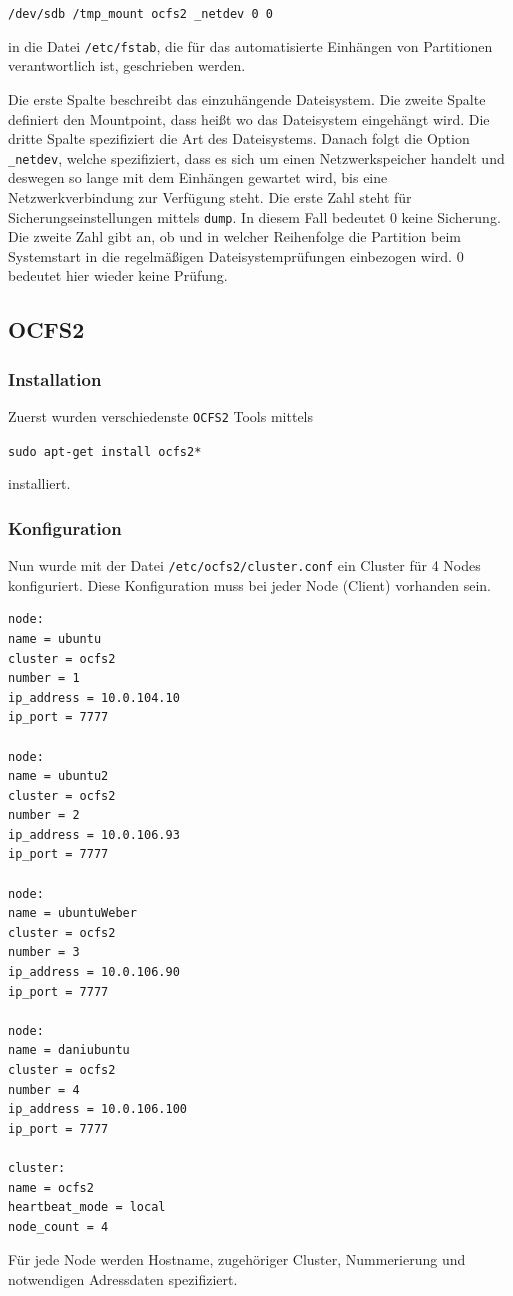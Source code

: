 \texttt{/dev/sdb	/tmp\_mount	ocfs2	\_netdev		0	0}

in die Datei \texttt{/etc/fstab}, die für das automatisierte Einhängen von Partitionen verantwortlich ist, geschrieben werden. \cite{ocfs2faq}

Die erste Spalte beschreibt das einzuhängende Dateisystem. Die zweite Spalte definiert den Mountpoint, dass heißt wo das Dateisystem eingehängt wird. Die dritte Spalte spezifiziert die Art des Dateisystems. Danach folgt die Option \texttt{\_netdev}, welche spezifiziert, dass es sich um einen Netzwerkspeicher handelt und deswegen so lange mit dem Einhängen gewartet wird, bis eine Netzwerkverbindung zur Verfügung steht. Die erste Zahl steht für Sicherungseinstellungen mittels \texttt{dump}. In diesem Fall bedeutet 0 keine Sicherung. Die zweite Zahl gibt an, ob und in welcher Reihenfolge die Partition beim Systemstart in die regelmäßigen Dateisystemprüfungen einbezogen wird. 0 bedeutet hier wieder keine Prüfung. \cite{ubuntuusersfstab}
\subsection{OCFS2}
\subsubsection{Installation}
Zuerst wurden verschiedenste \texttt{OCFS2} Tools mittels

\texttt{sudo apt-get install ocfs2*}

installiert.\clearpage
\subsubsection{Konfiguration}
Nun wurde mit der Datei \texttt{/etc/ocfs2/cluster.conf} ein Cluster für 4 Nodes konfiguriert. Diese Konfiguration muss bei jeder Node (Client) vorhanden sein.
\begin{lstlisting}[style=bash, caption=\texttt{/etc/ocfs2/cluster.conf}]
node:
name = ubuntu
cluster = ocfs2
number = 1
ip_address = 10.0.104.10
ip_port = 7777

node:
name = ubuntu2
cluster = ocfs2
number = 2
ip_address = 10.0.106.93
ip_port = 7777

node:
name = ubuntuWeber
cluster = ocfs2
number = 3
ip_address = 10.0.106.90
ip_port = 7777

node:
name = daniubuntu
cluster = ocfs2
number = 4
ip_address = 10.0.106.100
ip_port = 7777

cluster:
name = ocfs2
heartbeat_mode = local
node_count = 4

\end{lstlisting}
Für jede Node werden Hostname, zugehöriger Cluster, Nummerierung und notwendigen Adressdaten spezifiziert.

